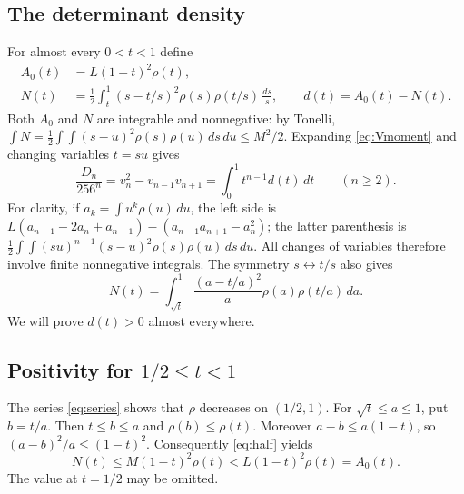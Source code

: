 \documentclass[11pt]{article}
\begin{document}
\subsection*{The determinant density}
For almost every $0<t<1$ define
\begin{align}
 A_0(t)&=L(1-t)^2\rho(t),\label{eq:A}\\
 N(t)&=\frac12\int_t^1(s-t/s)^2\rho(s)\rho(t/s)\,\frac{ds}{s},
 \qquad d(t)=A_0(t)-N(t).\label{eq:N}
\end{align}
Both $A_0$ and $N$ are integrable and nonnegative: by Tonelli,
$\int N=\frac12\int\!\int(s-u)^2\rho(s)\rho(u)\,ds\,du\leq M^2/2$.
Expanding \eqref{eq:Vmoment} and changing variables $t=su$ gives
\begin{equation}\label{eq:Dmoment}
 \frac{D_n}{256^n}=v_n^2-v_{n-1}v_{n+1}
                 =\int_0^1t^{n-1}d(t)\,dt\qquad(n\geq2).
\end{equation}
For clarity, if $a_k=\int u^k\rho(u)\,du$, the left side is
$L(a_{n-1}-2a_n+a_{n+1})-(a_{n-1}a_{n+1}-a_n^2)$;
the latter parenthesis is
$\frac12\int\!\int(su)^{n-1}(s-u)^2\rho(s)\rho(u)\,ds\,du$.
All changes of variables therefore involve finite nonnegative integrals.
The symmetry $s\leftrightarrow t/s$ also gives
\begin{equation}\label{eq:half}
 N(t)=\int_{\sqrt t}^1\frac{(a-t/a)^2}{a}\rho(a)\rho(t/a)\,da.
\end{equation}
We will prove $d(t)>0$ almost everywhere.

\subsection*{Positivity for $1/2\leq t<1$}
The series \eqref{eq:series} shows that $\rho$ decreases on $(1/2,1)$.
For $\sqrt t\leq a\leq1$, put $b=t/a$. Then $t\leq b\leq a$
and $\rho(b)\leq\rho(t)$. Moreover
$a-b\leq a(1-t)$, so $(a-b)^2/a\leq(1-t)^2$.
Consequently \eqref{eq:half} yields
\begin{equation}\label{eq:endbound}
 N(t)\leq M(1-t)^2\rho(t)<L(1-t)^2\rho(t)=A_0(t).
\end{equation}
The value at $t=1/2$ may be omitted.
\end{document}
